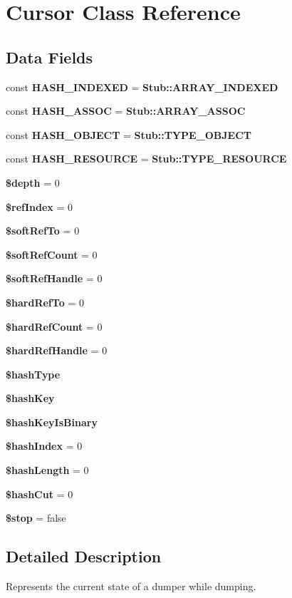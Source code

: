 \section{Cursor Class Reference}
\label{class_symfony_1_1_component_1_1_var_dumper_1_1_cloner_1_1_cursor}
\subsection*{Data Fields}
\begin{DoxyCompactItemize}
\item 
const {\bf H\+A\+S\+H\+\_\+\+I\+N\+D\+E\+X\+E\+D} = {\bf Stub\+::\+A\+R\+R\+A\+Y\+\_\+\+I\+N\+D\+E\+X\+E\+D}
\item 
const {\bf H\+A\+S\+H\+\_\+\+A\+S\+S\+O\+C} = {\bf Stub\+::\+A\+R\+R\+A\+Y\+\_\+\+A\+S\+S\+O\+C}
\item 
const {\bf H\+A\+S\+H\+\_\+\+O\+B\+J\+E\+C\+T} = {\bf Stub\+::\+T\+Y\+P\+E\+\_\+\+O\+B\+J\+E\+C\+T}
\item 
const {\bf H\+A\+S\+H\+\_\+\+R\+E\+S\+O\+U\+R\+C\+E} = {\bf Stub\+::\+T\+Y\+P\+E\+\_\+\+R\+E\+S\+O\+U\+R\+C\+E}
\item 
{\bf \$depth} = 0
\item 
{\bf \$ref\+Index} = 0
\item 
{\bf \$soft\+Ref\+To} = 0
\item 
{\bf \$soft\+Ref\+Count} = 0
\item 
{\bf \$soft\+Ref\+Handle} = 0
\item 
{\bf \$hard\+Ref\+To} = 0
\item 
{\bf \$hard\+Ref\+Count} = 0
\item 
{\bf \$hard\+Ref\+Handle} = 0
\item 
{\bf \$hash\+Type}
\item 
{\bf \$hash\+Key}
\item 
{\bf \$hash\+Key\+Is\+Binary}
\item 
{\bf \$hash\+Index} = 0
\item 
{\bf \$hash\+Length} = 0
\item 
{\bf \$hash\+Cut} = 0
\item 
{\bf \$stop} = false
\end{DoxyCompactItemize}


\subsection{Detailed Description}
Represents the current state of a dumper while dumping.

